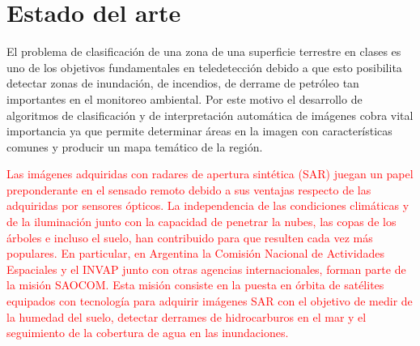 \documentclass[11pt]{article}
\begin{document}
\section{Estado del arte}

El problema de clasificación de una zona de una superficie terrestre en clases es uno de los objetivos fundamentales en teledetección debido a que esto posibilita detectar zonas de inundación, de incendios, de derrame de petróleo tan importantes en el monitoreo ambiental. 
Por este motivo el desarrollo de algoritmos de clasificación y de interpretación automática de imágenes cobra vital importancia  ya que permite determinar áreas en la imagen con características comunes  y producir un mapa temático de la región. 

\textcolor{red}{Las imágenes adquiridas con radares de apertura sintética (SAR) juegan un papel preponderante en el sensado remoto debido a sus ventajas respecto de las adquiridas por sensores ópticos. La independencia de las condiciones climáticas y de la iluminación junto con la capacidad de penetrar la nubes, las copas de los árboles e incluso el suelo, han contribuido para que resulten cada vez más populares. }
\textcolor{red}{
En particular, en Argentina la Comisión Nacional de Actividades Espaciales y el INVAP junto con otras agencias internacionales, forman parte de la misión SAOCOM. Esta misión consiste en la puesta en órbita de satélites equipados con tecnología para adquirir imágenes SAR con el objetivo de medir de la humedad del suelo, detectar derrames de hidrocarburos en el mar y el seguimiento de la cobertura de agua en las inundaciones. }
\end{document}
